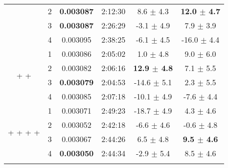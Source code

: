 \begin{table}[H]
\begin{adjustbox}{center}
\begin{tabular}{@{} cccc|cc @{}}
 & 2 & \bf0.003087 & 2:12:30 & 8.6 $\pm$ 4.3 & \bf12.0 $\pm$ 4.7\\
 & 3 & \bf0.003087 & 2:26:29 & -3.1 $\pm$ 4.9 & 7.9 $\pm$ 3.9\\
 & 4 & 0.003095 & 2:38:25 & -6.1 $\pm$ 4.5 & -16.0 $\pm$ 4.4\\
\midrule
{} & 1 & 0.003086 & 2:05:02 & 1.0 $\pm$ 4.8 & 9.0 $\pm$ 6.0\\
 & 2 & 0.003082 & 2:06:16 & \bf12.9 $\pm$ 4.8 & 7.1 $\pm$ 5.5\\
 & 3 & \bf0.003079 & 2:04:53 & -14.6 $\pm$ 5.1 & 2.3 $\pm$ 5.5\\
 & 4 & 0.003085 & 2:07:18 & -10.1 $\pm$ 4.9 & -7.6 $\pm$ 4.4\\
\midrule
{} & 1 & 0.003071 & 2:49:23 & -18.7 $\pm$ 4.9 & 4.3 $\pm$ 4.6\\
 & 2 & 0.003052 & 2:42:18 & -6.6 $\pm$ 4.6 & -0.6 $\pm$ 4.8\\
 & 3 & 0.003067 & 2:44:26 & 6.5 $\pm$ 4.8 & \bf9.5 $\pm$ 4.6\\
 & 4 & \bf0.003050 & 2:44:34 & -2.9 $\pm$ 5.4 & 8.5 $\pm$ 4.6\\
\midrule
{} \\
\end{tabular}
\end{adjustbox}
\end{table}
